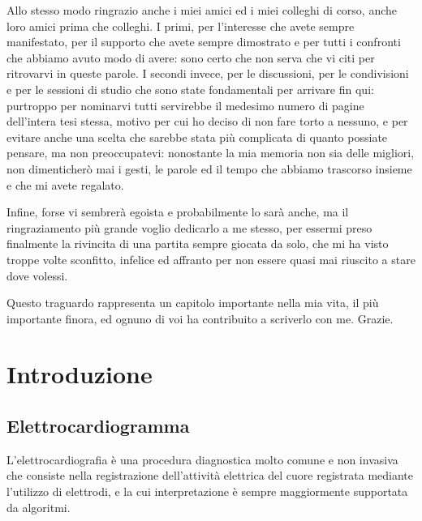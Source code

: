 \documentclass[12pt,italian]{report}
\newcommand\blankpage{%
    \null
    \thispagestyle{empty}%
    \addtocounter{page}{-1}%
    \newpage}
\begin{document}
	Allo stesso modo ringrazio anche i miei amici ed i miei colleghi di corso, anche loro amici prima che colleghi. I primi, per l'interesse che avete sempre manifestato, per il supporto che avete sempre dimostrato e per tutti i confronti che abbiamo avuto modo di avere: sono certo che non serva che vi citi per ritrovarvi in queste parole. I secondi invece, per le discussioni, per le condivisioni e per le sessioni di studio che sono state fondamentali per arrivare fin qui: purtroppo per nominarvi tutti servirebbe il medesimo numero di pagine dell'intera tesi stessa, motivo per cui ho deciso di non fare torto a nessuno, e per evitare anche una scelta che sarebbe stata più complicata di quanto possiate pensare, ma non preoccupatevi: nonostante la mia memoria non sia delle migliori, non dimenticherò mai i gesti, le parole ed il tempo che abbiamo trascorso insieme e che mi avete regalato.
	
	Infine, forse vi sembrerà egoista e probabilmente lo sarà anche, ma il ringraziamento più grande voglio dedicarlo a me stesso, per essermi preso finalmente la rivincita di una partita sempre giocata da solo, che mi ha visto troppe volte sconfitto, infelice ed affranto per non essere quasi mai riuscito a stare dove volessi.
	
	Questo traguardo rappresenta un capitolo importante nella mia vita, il più importante finora, ed ognuno di voi ha contribuito a scriverlo con me. Grazie.
	
	\afterpage{\blankpage}
	
	
	\afterpreface
	\afterpage{\blankpage}
	
	
	\chapter{Introduzione}
	\label{chap:introduzione}
	
	
	\section{Elettrocardiogramma}
	\label{sec:elettrocardiogramma}
	
	L'elettrocardiografia è una procedura diagnostica molto comune e non invasiva che consiste nella registrazione dell'attività elettrica del cuore registrata mediante l'utilizzo di elettrodi, e la cui interpretazione è sempre maggiormente supportata da algoritmi.
	
\end{document}
